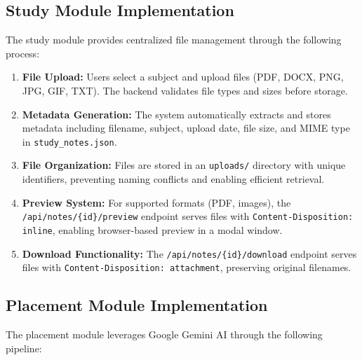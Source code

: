 \documentclass[12pt]{article}
\begin{document}
\subsection{Study Module Implementation}
The study module provides centralized file management through the following process:

\begin{enumerate}
    \item \textbf{File Upload:} Users select a subject and upload files (PDF, DOCX, PNG, JPG, GIF, TXT). The backend validates file types and sizes before storage.
    
    \item \textbf{Metadata Generation:} The system automatically extracts and stores metadata including filename, subject, upload date, file size, and MIME type in \texttt{study\_notes.json}.
    
    \item \textbf{File Organization:} Files are stored in an \texttt{uploads/} directory with unique identifiers, preventing naming conflicts and enabling efficient retrieval.
    
    \item \textbf{Preview System:} For supported formats (PDF, images), the \texttt{/api/notes/\{id\}/preview} endpoint serves files with \texttt{Content-Disposition: inline}, enabling browser-based preview in a modal window.
    
    \item \textbf{Download Functionality:} The \texttt{/api/notes/\{id\}/download} endpoint serves files with \texttt{Content-Disposition: attachment}, preserving original filenames.
\end{enumerate}

\subsection{Placement Module Implementation}
The placement module leverages Google Gemini AI through the following pipeline:
\end{document}
